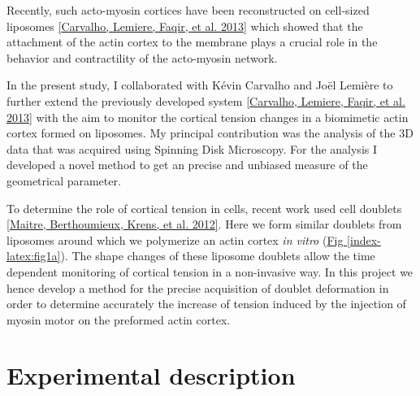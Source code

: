 \documentclass[A4paperpaper,11pt,english]{sphinxmanual}
\begin{document}
Recently, such acto-myosin cortices have been reconstructed on cell-sized
liposomes {\hyperref[index-latex:carvalho2013a]{{[}Carvalho, Lemiere, Faqir,  et al.  2013{]}}} which showed that the attachment of the actin
cortex to the membrane plays a crucial role in the behavior and contractility
of the acto-myosin network.

In the present study, I collaborated with Kévin Carvalho and Joël Lemière to
further extend the previously developed system {\hyperref[index-latex:carvalho2013a]{{[}Carvalho, Lemiere, Faqir,  et al.  2013{]}}} with the
aim to monitor the cortical tension changes in a biomimetic actin cortex formed
on liposomes. My principal contribution was the analysis of the 3D data that
was acquired using Spinning Disk Microscopy. For the analysis I developed a
novel method to get an precise and unbiased measure of the geometrical
parameter.

To determine the role of cortical tension in cells, recent work used cell
doublets {\hyperref[index-latex:maitre2012]{{[}Maitre, Berthoumieux, Krens,  et al.  2012{]}}}.  Here we form similar doublets from liposomes
around which we polymerize an actin cortex \emph{in vitro} (\hyperref[index-latex:fig1a]{Fig  \ref*{index-latex:fig1a}}). The
shape changes of these liposome doublets allow the time dependent monitoring of
cortical tension in a non-invasive way.  In this project we hence develop a
method for the precise acquisition of doublet deformation in order to determine
accurately the increase of tension induced by the injection of myosin motor on
the preformed actin cortex.


\section{Experimental description}
\label{index-latex:experimental-description}
\end{document}
